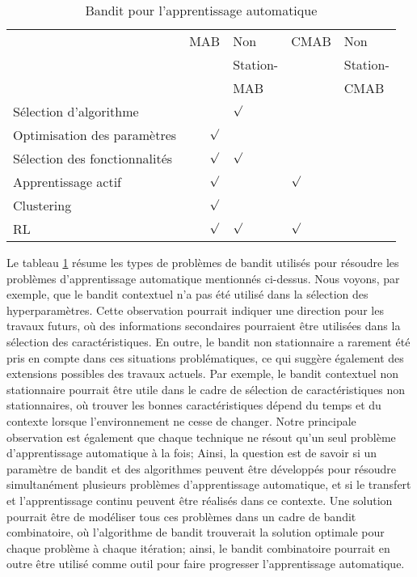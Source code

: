 \documentclass[conference]{IEEEtran}
\newcommand{\1}[1]{\mathbbm{1}_{\left\{#1\right\}}}
\begin{document}
 \begin{table}[]
\scriptsize
\caption {Bandit pour l'apprentissage automatique}
\label{tab:ML} 
\begin{tabular}{|l|r|l|l|l|}
\hline
                                  & MAB          & Non            & CMAB  & Non  \\ 
                                  &              & Station-      &       & Station- \\ 
                                  &              &  MAB     &       &  CMAB\\ 
                                  \hline
Sélection d'algorithme      &              & $\surd$                  &             &                                  \\ \hline
Optimisation des paramètres  &    $\surd$   &                           &            &                                  \\ \hline
Sélection des fonctionnalités    &    $\surd$   &       $\surd$             &            &                                  \\ \hline
Apprentissage actif        &    $\surd$   &                            &   $\surd$    &                                  \\ \hline
Clustering             &   $\surd$    &                           &            &                                  \\ \hline
RL  &  $\surd$     &       $\surd$                &    $\surd$         &                                  \\ \hline
\end{tabular}
\end{table}
Le tableau \ref{tab:ML} résume les types de problèmes de bandit utilisés pour résoudre les problèmes d'apprentissage automatique mentionnés ci-dessus. Nous voyons, par exemple, que le bandit contextuel n'a pas été utilisé dans la sélection des hyperparamètres. Cette observation pourrait indiquer une direction pour les travaux futurs, où des informations secondaires pourraient être utilisées dans la sélection des caractéristiques. En outre, le bandit non stationnaire a rarement été pris en compte dans ces situations problématiques, ce qui suggère également des extensions possibles des travaux actuels. Par exemple, le bandit contextuel non stationnaire pourrait être utile dans le cadre de sélection de caractéristiques non stationnaires, où trouver les bonnes caractéristiques dépend du temps et du contexte lorsque l'environnement ne cesse de changer. Notre principale observation est également que chaque technique ne résout qu'un seul problème d'apprentissage automatique à la fois; Ainsi, la question est de savoir si un paramètre de bandit et des algorithmes peuvent être développés pour résoudre simultanément plusieurs problèmes d'apprentissage automatique, et si le transfert et l'apprentissage continu peuvent être réalisés dans ce contexte. Une solution pourrait être de modéliser tous ces problèmes dans un cadre de bandit combinatoire, où l'algorithme de bandit trouverait la solution optimale pour chaque problème à chaque itération; ainsi, le bandit combinatoire pourrait en outre être utilisé comme outil pour faire progresser l'apprentissage automatique. 
 
\end{document}
